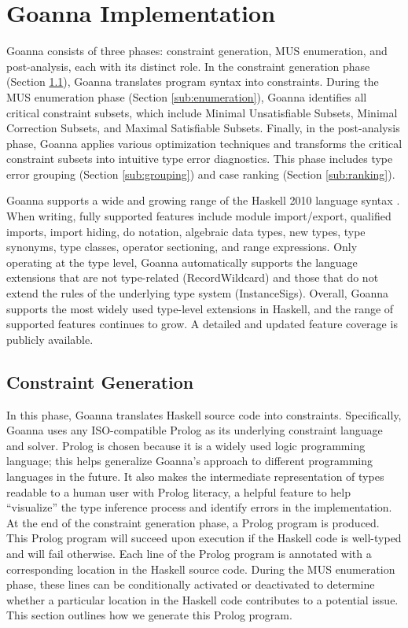 \documentclass[pdflatex,lineno,sn-nature,Numbered]{sn-jnl}%
\begin{document}
    \section{Goanna Implementation} \label{sec:implementation}
Goanna consists of three phases: constraint generation, MUS enumeration, and post-analysis, each with its distinct role. In the constraint generation phase (Section \ref{sub:translation}), Goanna translates program syntax into constraints. During the MUS enumeration phase (Section \ref{sub:enumeration}), Goanna identifies all critical constraint subsets, which include Minimal Unsatisfiable Subsets, Minimal Correction Subsets, and Maximal Satisfiable Subsets. Finally, in the post-analysis phase, Goanna applies various optimization techniques and transforms the critical constraint subsets into intuitive type error diagnostics. This phase includes type error grouping (Section \ref{sub:grouping}) and case ranking (Section \ref{sub:ranking}).

    Goanna supports a wide and growing range of the Haskell 2010 language syntax \cite{Simon_Marlow2010-lg}. When writing, fully supported features include module import/export, qualified imports, import hiding, do notation, algebraic data types, new types, type synonyms, type classes, operator sectioning, and range expressions. Only operating at the type level, Goanna automatically supports the language extensions that are not type-related (RecordWildcard) and those that do not extend the rules of the underlying type system (InstanceSigs). Overall, Goanna supports the most widely used type-level extensions in Haskell, and the range of supported features continues to grow.  A detailed and updated feature coverage \cite{Fu2023-rp} is publicly available.

    \subsection{Constraint Generation} \label{sub:translation}
In this phase, Goanna translates Haskell source code into constraints. Specifically, Goanna uses any ISO-compatible Prolog \cite{Wielemaker2011-sr} as its underlying constraint language and solver. Prolog is chosen because it is a widely used logic programming language; this helps generalize Goanna's approach to different programming languages in the future. It also makes the intermediate representation of types readable to a human user with Prolog literacy, a helpful feature to help ``visualize'' the type inference process and identify errors in the implementation. At the end of the constraint generation phase, a Prolog program is produced. This Prolog program will succeed upon execution if the Haskell code is well-typed and will fail otherwise. Each line of the Prolog program is annotated with a corresponding location in the Haskell source code. During the MUS enumeration phase, these lines can be conditionally activated or deactivated to determine whether a particular location in the Haskell code contributes to a potential issue. This section outlines how we generate this Prolog program. 
\end{document}
